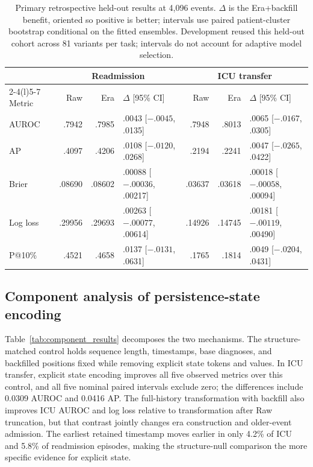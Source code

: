 \documentclass{article}
\begin{document}
\begin{table}[!htbp]
  \caption{Primary retrospective held-out results at 4,096 events. $\Delta$ is the
  Era+backfill benefit, oriented so positive is better; intervals use paired
  patient-cluster bootstrap conditional on the fitted ensembles. Development
  reused this held-out cohort across 81 variants per task; intervals do not
  account for adaptive model selection.}
  \label{tab:primary_results}
  \centering
  \footnotesize
  \begin{tabular*}{\linewidth}{@{\extracolsep{\fill}}lrrlrrl@{}}
    \toprule
    & \multicolumn{3}{c}{Readmission} & \multicolumn{3}{c}{ICU transfer} \\
    \cmidrule(lr){2-4}\cmidrule(l){5-7}
    Metric & Raw & Era & $\Delta$ [95\% CI] & Raw & Era & $\Delta$ [95\% CI] \\
    \midrule
    AUROC & .7942 & .7985 & .0043 [$-.0045$, .0135]
      & .7948 & .8013 & .0065 [$-.0167$, .0305] \\
    AP & .4097 & .4206 & .0108 [$-.0120$, .0268]
      & .2194 & .2241 & .0047 [$-.0265$, .0422] \\
    Brier & .08690 & .08602 & .00088 [$-.00036$, .00217]
      & .03637 & .03618 & .00018 [$-.00058$, .00094] \\
    Log loss & .29956 & .29693 & .00263 [$-.00077$, .00614]
      & .14926 & .14745 & .00181 [$-.00119$, .00490] \\
    P@10\% & .4521 & .4658 & .0137 [$-.0131$, .0631]
      & .1765 & .1814 & .0049 [$-.0204$, .0431] \\
    \bottomrule
  \end{tabular*}
\end{table}

\FloatBarrier

\subsection{Component analysis of persistence-state encoding}

Table~\ref{tab:component_results} decomposes the two mechanisms. The
structure-matched control holds sequence length, timestamps, base
diagnoses, and backfilled positions fixed while removing explicit state tokens
and values. In ICU transfer, explicit state encoding improves all five observed
metrics over this control, and all five nominal paired intervals exclude zero;
the differences include 0.0309 AUROC and 0.0416 AP. The full-history
transformation with backfill also improves ICU AUROC and log loss relative to
transformation after Raw truncation, but that contrast jointly changes era
construction and older-event admission. The earliest retained timestamp moves
earlier in only 4.2\% of ICU and 5.8\% of readmission episodes, making the
structure-null comparison the more specific evidence for explicit state.
\end{document}
